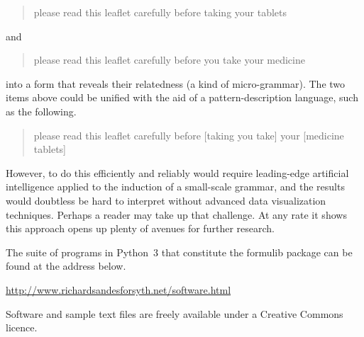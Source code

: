 \documentclass[output=paper]{langscibook}
\begin{document}
\begin{quote}
please read this leaflet carefully before taking your tablets
\end{quote}
and

\begin{quote}
please read this leaflet carefully before you take your medicine
\end{quote}
into a form that reveals their relatedness (a kind of micro-grammar). The two items above could be unified with the aid of a pattern-description language, such as the following.

\begin{quote}
please read this leaflet carefully before [taking {\textbar} you take] your [medicine {\textbar} tablets]
\end{quote}

However, to do this efficiently and reliably would require leading-edge artificial intelligence applied to the induction of a small-scale grammar, and the results would doubtless be hard to interpret without advanced data visualization techniques. Perhaps a reader may take up that challenge. At any rate it shows this approach opens up plenty of avenues for further research.


The suite of programs in Python~3 that constitute the formulib package can be found at the address below.

\url{http://www.richardsandesforsyth.net/software.html}

Software and sample text files are freely available under a Creative Commons licence.

{\sloppy\printbibliography[heading=subbibliography,notkeyword=this]}
\end{document}
